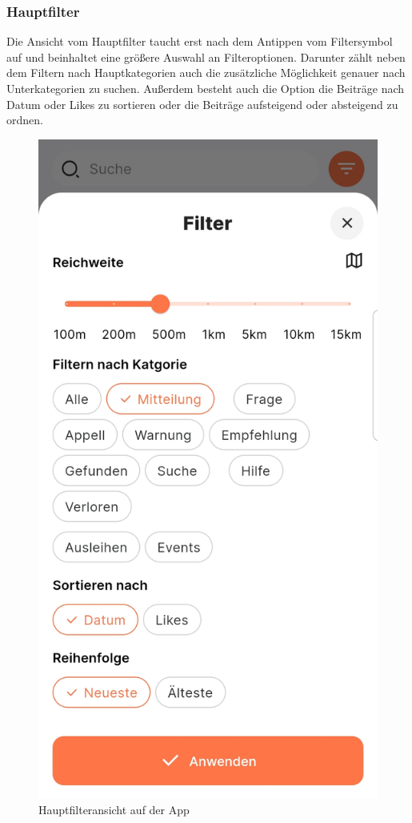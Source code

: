 \subsubsection{Hauptfilter}

Die Ansicht vom Hauptfilter taucht erst nach dem Antippen vom Filtersymbol auf und beinhaltet eine größere Auswahl an Filteroptionen. Darunter zählt neben dem Filtern nach Hauptkategorien auch die zusätzliche Möglichkeit genauer nach Unterkategorien zu suchen. Außerdem besteht auch die Option die Beiträge nach Datum oder Likes zu sortieren oder die Beiträge aufsteigend oder absteigend zu ordnen.

\begin{figure}[h]
  \centering
  \includegraphics[width=\textwidth]{pics/main-filter.jpg}
  \caption{Hauptfilteransicht auf der App}
\end{figure}

